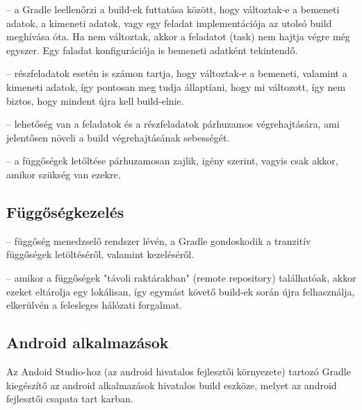 \begin{description}
	\setlength{\itemsep}{0.04mm}
	\item[Inkrementális build] -- a Gradle leellenőrzi a build-ek futtatása között, hogy változtak-e a bemeneti adatok, a kimeneti adatok, vagy egy feladat implementációja az utolsó build meghívása óta. Ha nem változtak, akkor a feladatot (task) nem hajtja végre még egyszer. Egy faladat konfigurációja is bemeneti adatként tekintendő.
	\item[Inktrementális részfeladatok] -- részfeladatok esetén is számon tartja, hogy változtak-e a bemeneti, valamint a kimeneti adatok, így pontosan meg tudja állaptíani, hogy mi változott, így nem biztos, hogy mindent újra kell build-elnie.
	\item[Párhuzamos végrehajtás] -- lehetőség van a feladatok és a részfeladatok párhuzamos végrehajtására, ami jelentősen növeli a build végrehajtásának sebességét.
	\item[Függőségek párhuzamos letöltése] -- a függőségek letőltése párhuzamosan zajlik, igény szerint, vagyis csak akkor, amikor szükség van ezekre.
\end{description}

\subsection{Függőségkezelés}

\begin{description}
	\setlength{\itemsep}{0.04mm}
	\item[Tranzitív függőségek] -- függőség menedzselő rendszer lévén, a Gradle gondoskodik a tranzitív függőségek letöltéséről, valamint kezeléséről.
	\item[Külső függőségek] -- amikor a függőségek "távoli raktárakban" (remote repository) találhatóak, akkor ezeket eltárolja egy lokálisan, így egymást követő build-ek során újra felhasználja, elkerülvén a felesleges hálózati forgalmat.
\end{description}

\subsection{Android alkalmazások}

Az Andoid Studio-hoz (az android hivatalos fejlesztői környezete) tartozó Gradle kiegészítő az android alkalmazások hivatalos build eszköze, melyet az android fejlesztői csapata tart karban.

